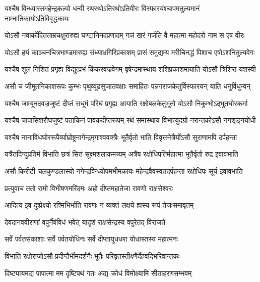 \twolineshloka
{यश्चैष विन्ध्यास्तमहेन्द्रकल्पो धन्वी रथस्थोऽतिरथोऽतिवीरः}
{विस्फारयंश्चापमतुल्यमानं नाम्नातिकायोऽतिविवृद्धकायः} %

\twolineshloka
{योऽसौ नवार्कोदितताम्रचक्षुरारुह्य घण्टानिनदप्रणादम्}
{गजं खरं गर्जति वै महात्मा महोदरो नाम स एष वीरः} %

\twolineshloka
{योऽसौ हयं काञ्चनचित्रभाण्डमारुह्य संध्याभ्रगिरिप्रकाशम्}
{प्रासं समुद्यम्य मरीचिनद्धं पिशाच एषोऽशनितुल्यवेगः} %

\twolineshloka
{यश्चैष शूलं निशितं प्रगृह्य विद्युत्प्रभं किंकरवज्रवेगम्}
{वृषेन्द्रमास्थाय शशिप्रकाशमायाति योऽसौ त्रिशिरा यशस्वी} %

\twolineshloka
{असौ च जीमूतनिकाशरूपः कुम्भः पृथुव्यूढसुजातवक्षाः}
{समाहितः पन्नगराजकेतुर्विस्फारयन् याति धनुर्विधुन्वन्} %

\twolineshloka
{यश्चैष जाम्बूनदवज्रजुष्टं दीप्तं सधूमं परिघं प्रगृह्य}
{आयाति रक्षोबलकेतुभूतो योऽसौ निकुम्भोऽद्भुतघोरकर्मा} %

\twolineshloka
{यश्चैष चापासिशरौघजुष्टं पताकिनं पावकदीप्तरूपम्}
{रथं समास्थाय विभात्युदग्रो नरान्तकोऽसौ नगशृङ्गयोधी} %

\twolineshloka
{यश्चैष नानाविधघोररूपैर्व्याघ्रोष्ट्रनागेन्द्रमृगाश्ववक्त्रैः}
{भूतैर्वृतो भाति विवृत्तनेत्रैर्योऽसौ सुराणामपि दर्पहन्ता} %

\twolineshloka
{यत्रैतदिन्दुप्रतिमं विभाति छत्रं सितं सूक्ष्मशलाकमग्र्यम्}
{अत्रैष रक्षोधिपतिर्महात्मा भूतैर्वृतो रुद्र इवावभाति} %

\twolineshloka
{असौ किरीटी चलकुण्डलास्यो नगेन्द्रविन्ध्योपमभीमकायः}
{महेन्द्रवैवस्वतदर्पहन्ता रक्षोधिपः सूर्य इवावभाति} %

\twolineshloka
{प्रत्युवाच ततो रामो विभीषणमरिंदमः}
{अहो दीप्तमहातेजा रावणो राक्षसेश्वरः} %

\twolineshloka
{आदित्य इव दुष्प्रेक्ष्यो रश्मिभिर्भाति रावणः}
{न व्यक्तं लक्षये ह्यस्य रूपं तेजःसमावृतम्} %

\twolineshloka
{देवदानववीराणां वपुर्नैवंविधं भवेत्}
{यादृशं राक्षसेन्द्रस्य वपुरेतद् विराजते} %

\twolineshloka
{सर्वे पर्वतसंकाशाः सर्वे पर्वतयोधिनः}
{सर्वे दीप्तायुधधरा योधास्तस्य महात्मनः} %

\twolineshloka
{विभाति रक्षोराजोऽसौ प्रदीप्तैर्भीमदर्शनैः}
{भूतैः परिवृतस्तीक्ष्णैर्देहवद्भिरिवान्तकः} %

\twolineshloka
{दिष्ट्यायमद्य पापात्मा मम दृष्टिपथं गतः}
{अद्य क्रोधं विमोक्ष्यामि सीताहरणसम्भवम्} %

